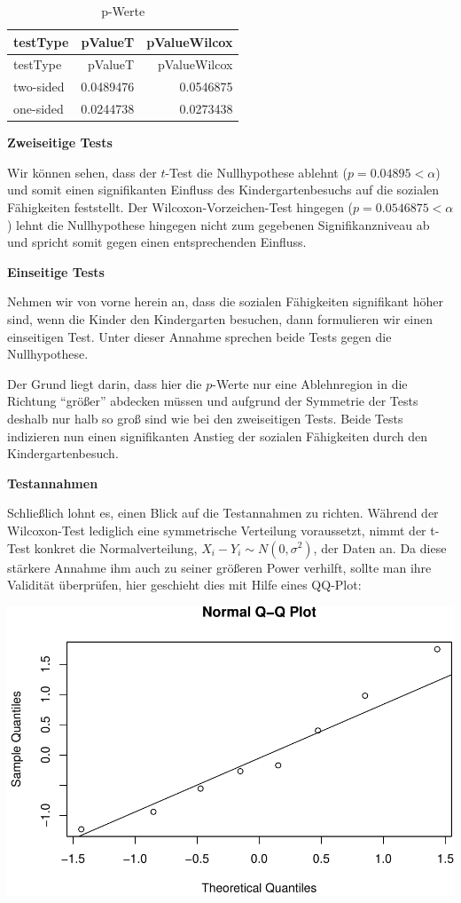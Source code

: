 \documentclass[10pt,]{article}
\begin{document}
\begin{longtable}[]{@{}lrr@{}}
\caption{p-Werte}\tabularnewline
\toprule
testType & pValueT & pValueWilcox\tabularnewline
\midrule
\endfirsthead
\toprule
testType & pValueT & pValueWilcox\tabularnewline
\midrule
\endhead
two-sided & 0.0489476 & 0.0546875\tabularnewline
one-sided & 0.0244738 & 0.0273438\tabularnewline
\bottomrule
\end{longtable}

\textbf{Zweiseitige Tests}

Wir können sehen, dass der \(t\)-Test die Nullhypothese ablehnt
(\(p = 0.04895 < \alpha\)) und somit einen signifikanten Einfluss des
Kindergartenbesuchs auf die sozialen Fähigkeiten feststellt. Der
Wilcoxon-Vorzeichen-Test hingegen (\(p = 0.0546875 < \alpha\)) lehnt die
Nullhypothese hingegen nicht zum gegebenen Signifikanzniveau ab und
spricht somit gegen einen entsprechenden Einfluss.

\textbf{Einseitige Tests}

Nehmen wir von vorne herein an, dass die sozialen Fähigkeiten
signifikant höher sind, wenn die Kinder den Kindergarten besuchen, dann
formulieren wir einen einseitigen Test. Unter dieser Annahme sprechen
beide Tests gegen die Nullhypothese.

Der Grund liegt darin, dass hier die \(p\)-Werte nur eine Ablehnregion
in die Richtung ``größer'' abdecken müssen und aufgrund der Symmetrie
der Tests deshalb nur halb so groß sind wie bei den zweiseitigen Tests.
Beide Tests indizieren nun einen signifikanten Anstieg der sozialen
Fähigkeiten durch den Kindergartenbesuch.

\textbf{Testannahmen}

Schließlich lohnt es, einen Blick auf die Testannahmen zu richten.
Während der Wilcoxon-Test lediglich eine symmetrische Verteilung
voraussetzt, nimmt der t-Test konkret die Normalverteilung,
\(X_i - Y_i \sim N(0,\sigma^2)\), der Daten an. Da diese stärkere
Annahme ihm auch zu seiner größeren Power verhilft, sollte man ihre
Validität überprüfen, hier geschieht dies mit Hilfe eines QQ-Plot:

\includegraphics{project2_files/figure-latex/Normalverteilungsannahme-1.pdf}
\end{document}
